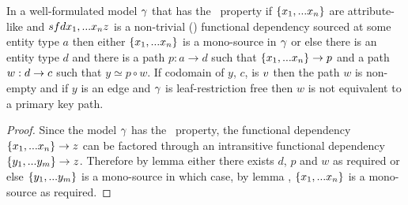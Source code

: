 \begin{lemma}
In a well-formulated model $\gamma$ that has the \fdfactoring\ property if $\left\{x_1,...x_n\right\}$ are attribute-like and
$sfd{x_1,...x_n}{z}$ is a non-trivial () functional dependency sourced
at some entity type $a$ then either $\left\{x_1,...x_n\right\}$ is a mono-source in $\gamma$
or else there is an entity type $d$ and there is a  path $p:a \rightarrow d$ such that $\{x_1,...x_n\} \rightarrow p$
and a  path $w:d \rightarrow c$  such that $y \simeq p \circ w$. If codomain of $y$, $c$, is $v$ then
the path $w$ is non-empty and if $y$ is an edge and $\gamma$ is leaf-restriction free then $w$ is not equivalent to a primary key path.
\end{lemma}
\begin{proof}
Since the model $\gamma$  has the \fdfactoring\ property, the functional dependency $\left\{x_1,...x_n\right\} \rightarrow z$ can be factored through an intransitive functional 
dependency $\left\{y_1,...y_m\right\} \rightarrow z$. Therefore by lemma  either there exists $d$, $p$ and $w$ as required
or else  $\left\{y_1,...y_m\right\}$ is a mono-source in which case, by lemma , $\left\{x_1,...x_n\right\}$ is a mono-source as required.
\end{proof}

